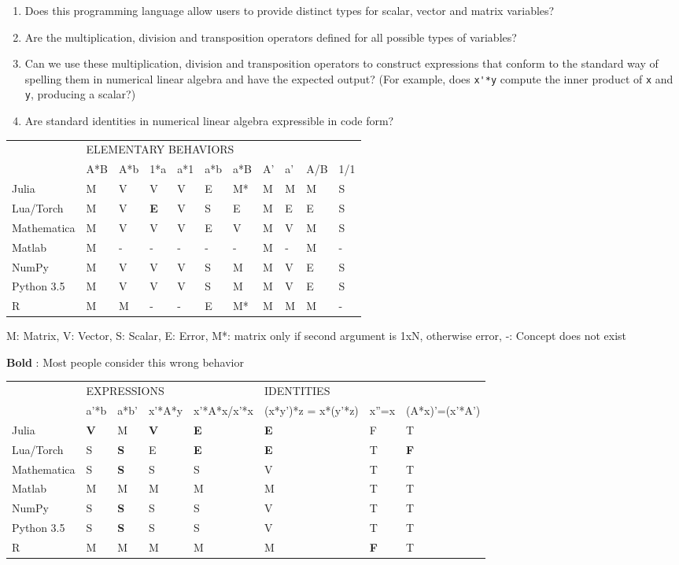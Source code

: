 \begin{enumerate}

\item
Does this programming language allow users to provide distinct types for scalar, vector and matrix variables?

\item
Are the multiplication, division and transposition operators defined for all possible types of variables?

\item
Can we use these multiplication, division and transposition operators to construct expressions that conform to the standard way of spelling them in numerical linear algebra and have the expected output? (For example, does \verb|x'*y| compute the inner product of \verb|x| and \verb|y|, producing a scalar?)

\item
Are standard identities in numerical linear algebra expressible in code form?

\end{enumerate}

\begin{tabular}{|l|l|l|l|l|l|l|l|l|l|l|}
\cline{2-11}
\multicolumn{1}{l|}{} & \multicolumn{10}{l|}{ELEMENTARY BEHAVIORS}\tabularnewline
\cline{2-11}
\multicolumn{1}{l|}{} & A{*}B & A{*}b & 1{*}a & a{*}1 & a{*}b & a{*}B & A' & a' & A/B & 1/1\tabularnewline
\hline
Julia & M & V & V & V & E & M{*} & M & M & M & S\tabularnewline
\hline
Lua/Torch & M & V & \textbf{E} & V & S & E & M & E & E & S\tabularnewline
\hline
Mathematica & M & V & V & V & E & V & M & V & M & S\tabularnewline
\hline
Matlab & M & - & - & - & - & - & M & - & M & -\tabularnewline
\hline
NumPy & M & V & V & V & S & M & M & V & E & S\tabularnewline
\hline
Python 3.5 & M & V & V & V & S & M & M & V & E & S\tabularnewline
\hline
R & M & M & - & - & E & M{*} & M & M & M & -\tabularnewline
\hline
\end{tabular}

M: Matrix, V: Vector, S: Scalar, E: Error, M{*}: matrix only if second
argument is 1xN, otherwise error, -: Concept does not exist

\textbf{Bold} : Most people consider this wrong behavior

\begin{tabular}{|l|l|l|l|l|l|l|l|}
\cline{2-8}
\multicolumn{1}{l|}{} & \multicolumn{4}{l|}{EXPRESSIONS} & \multicolumn{3}{l|}{IDENTITIES}\tabularnewline
\cline{2-8}
\multicolumn{1}{l|}{} & a'{*}b & a{*}b' & x'{*}A{*}y & x'{*}A{*}x/x'{*}x & (x{*}y'){*}z = x{*}(y'{*}z) & x''=x & (A{*}x)'=(x'{*}A')\tabularnewline
\hline
Julia & \textbf{V} & M & \textbf{V} & \textbf{E} & \textbf{E} & F & T\tabularnewline
\hline
Lua/Torch & S & \textbf{S} & E & \textbf{E} & \textbf{E} & T & \textbf{F}\tabularnewline
\hline
Mathematica & S & \textbf{S} & S & S & V & T & T\tabularnewline
\hline
Matlab & M & M & M & M & M & T & T\tabularnewline
\hline
NumPy & S & \textbf{S} & S & S & V & T & T\tabularnewline
\hline
Python 3.5 & S & \textbf{S} & S & S & V & T & T\tabularnewline
\hline
R & M & M & M & M & M & \textbf{F} & T\tabularnewline
\hline
\end{tabular}

